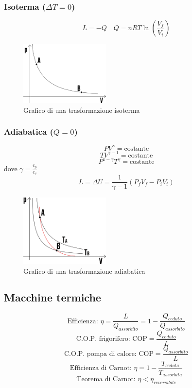 \documentclass[a4paper]{article}
\theoremstyle{break}
\theoremstyle{break}
\theoremstyle{break}
\theoremstyle{break}
\begin{document}
\subsubsection{Isoterma (\( \Delta T = 0 \))}
\[
L = -Q \quad Q = n R T \ln \left( \frac{V_f}{V_i} \right)
\] 
\begin{figure}[H]
  \begin{center}
    \includegraphics[width=0.4\textwidth]{isoterma}
  \end{center}
  \caption{Grafico di una trasformazione isoterma}
\end{figure}

\subsubsection{Adiabatica (\( Q = 0 \))}
\[
P V^\gamma = \text{costante}
\] 
\[
T V^{\gamma - 1} = \text{costante}
\] 
\[
  P^{1 - \gamma} T^\gamma = \text{costante}
\] 
dove \( \gamma = \frac{c_p}{c_v} \)
\[
L = \Delta U = \frac{1}{\gamma - 1} \left( P_f V_f - P_i V_i \right) 
\] 
\begin{figure}[H]
  \begin{center}
    \includegraphics[width=0.4\textwidth]{adiabatica}
  \end{center}
  \caption{Grafico di una trasformazione adiabatica}
\end{figure}

\subsection{Macchine termiche}
\[
  \text{Efficienza: } \eta = \frac{L}{Q_{assorbito}} = 1 - \frac{Q_{ceduto}}{Q_{assorbito}}
\]
\[
\text{C.O.P. frigorifero: } \text{COP} = \frac{Q_{ceduto}}{L}
\] 
\[
  \text{C.O.P. pompa di calore: } \text{COP} = \frac{Q_{assorbito}}{L}
\] 
\[
\text{Efficienza di Carnot: } \eta = 1 - \frac{T_{ceduta}}{T_{assorbita}}
\] 
\[
  \text{Teorema di Carnot: } \eta < \eta_{reversibile}
\] 
\end{document}
